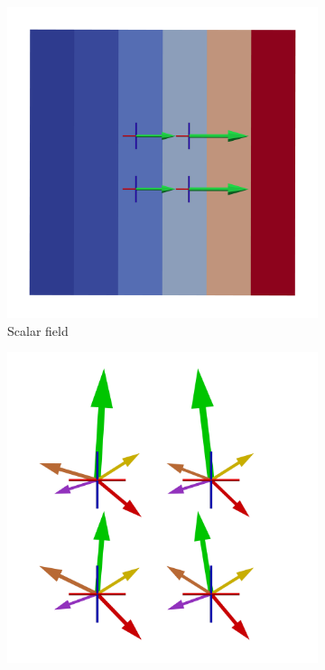 \begin{figure}[ht]
    \begin{subfigure}[b]{0.49\textwidth}
        \includegraphics[width=\textwidth]{Images/gradient.png}
        \caption{Scalar field}
        \label{fig:gradient}
    \end{subfigure}
    \begin{subfigure}[b]{0.49\textwidth}
        \includegraphics[width=\textwidth]{Images/samples.png}

\end{subfigure}
\end{figure}
